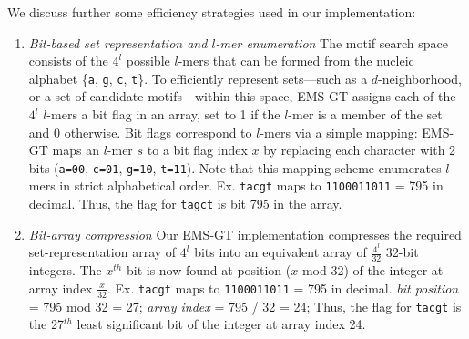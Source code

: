 \documentclass{acm_proc_article-sp}
\begin{document}
		We discuss further some efficiency strategies used in our implementation:
		\vspace{-5mm}
		\begin{enumerate} %
		\item{\em Bit-based set representation and $l$-mer enumeration}\newline
			The motif search space consists of the $4^{l}$ possible $l$-mers that can be formed from the nucleic alphabet \{\texttt{a}, \texttt{g}, \texttt{c}, \texttt{t}\}.
			To efficiently represent sets---such as a $d$-neighborhood, or a set of candidate motifs---within
			this space, EMS-GT assigns each of the $4^{l}$ $l$-mers a bit flag in an array,
			set to 1 if the $l$-mer is a member of the set and 0 otherwise.
			Bit flags correspond to $l$-mers via a simple mapping:
			EMS-GT maps an $l$-mer $s$ to a bit flag index $x$ by replacing each character with 2 bits 
			(\texttt{a=00}, \texttt{c=01}, \texttt{g=10}, \texttt{t=11}).
			Note that this mapping scheme enumerates $l$-mers in strict alphabetical order. \newline \newline
			{\small Ex. \texttt{tacgt} maps to \texttt{1100011011} = 795 in decimal. \newline
				\hspace*{18pt} Thus, the flag for \texttt{tagct} is bit 795 in the array.}	
		\item{\em Bit-array compression}\newline
			Our EMS-GT implementation compresses the required set-representation array of $4^{l}$ bits into an equivalent array of $\frac{4^{l}}{32}$ 32-bit integers. The $x^{th}$ bit is now found at position ($x$ mod 32) of the integer at array index $\frac{x}{32}$. \newline \newline
			{\small Ex. \texttt{tacgt} maps to \texttt{1100011011} = 795 in decimal.\newline
				\hspace*{18pt} \emph{bit position} = 795 mod 32 = 27;\newline
				\hspace*{18pt} \emph{array index}  = 795 / 32 = 24;\newline
				\hspace*{18pt}Thus, the flag for \texttt{tacgt} is the 27$^{th}$ least significant bit\newline
				\hspace*{18pt} of the integer at array index 24.}

\end{enumerate}
\end{document}
